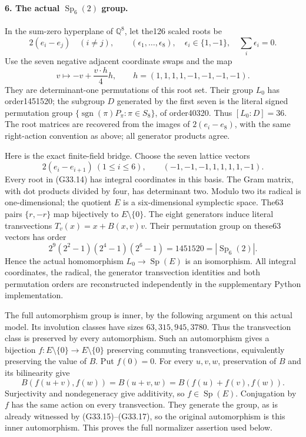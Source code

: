 \paragraph{6. The actual \(\operatorname{Sp}_6(2)\) group.}
In the sum-zero hyperplane of \(\mathbb Q^8\), let the126
scaled roots be
\[
 2(e_i-e_j)\quad(i\ne j),\qquad
 (\epsilon_1,\ldots,\epsilon_8),\quad
       \epsilon_i\in\{1,-1\},\quad\sum_i\epsilon_i=0.
                                                               \tag{G33.14}
\]
Use the seven negative adjacent coordinate swaps and the map
\[
             v\longmapsto-v+\frac{v\cdot h}{4}h,
       \qquad h=(1,1,1,1,-1,-1,-1,-1).                      \tag{G33.15}
\]
They are determinant-one permutations of this root set. Their
group \(L_0\) has order1451520; the subgroup \(D\) generated
by the first seven is the literal signed permutation group
\(\{\operatorname{sgn}(\pi)P_\pi:\pi\in S_8\}\), of order40320.
Thus \([L_0:D]=36\). The root matrices are recovered from the
images of \(2(e_i-e_8)\), with the same right-action convention
as above; all generator products agree.

Here is the exact finite-field bridge. Choose the seven lattice
vectors
\[
 2(e_i-e_{i+1})\ (1\le i\le6),\qquad
             (-1,-1,-1,1,1,1,1,-1).                        \tag{G33.16}
\]
Every root in (G33.14) has integral coordinates in this basis.
The Gram matrix, with dot products divided by four, has
determinant two. Modulo two its radical is one-dimensional;
the quotient \(E\) is a six-dimensional symplectic space.
The63 pairs \(\{r,-r\}\) map bijectively to \(E\setminus\{0\}\).
The eight generators induce literal transvections
\(T_v(x)=x+B(x,v)v\). Their permutation group on these63
vectors has order
\[
         2^9(2^2-1)(2^4-1)(2^6-1)=1451520
                    =|\operatorname{Sp}_6(2)|.             \tag{G33.17}
\]
Hence the actual homomorphism \(L_0\to\operatorname{Sp}(E)\)
is an isomorphism. All integral coordinates, the radical,
the generator transvection identities and both permutation
orders are reconstructed independently in the supplementary
Python implementation.

The full automorphism group is inner, by the following argument
on this actual model. Its involution classes have sizes
\(63,315,945,3780\). Thus the transvection class is preserved
by every automorphism. Such an automorphism gives a bijection
\(f:E\setminus\{0\}\to E\setminus\{0\}\) preserving commuting
transvections, equivalently preserving the value of \(B\).
Put \(f(0)=0\). For every \(u,v,w\), preservation of \(B\)
and its bilinearity give
\[
 B(f(u+v),f(w))=B(u+v,w)
      =B(f(u)+f(v),f(w)).
\]
Surjectivity and nondegeneracy give additivity, so
\(f\in\operatorname{Sp}(E)\). Conjugation by \(f\) has the
same action on every transvection. They generate the group,
as is already witnessed by (G33.15)--(G33.17), so the original
automorphism is this inner automorphism. This proves the full
normalizer assertion used below.

